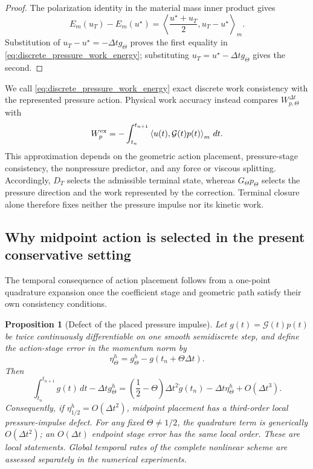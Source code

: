 \documentclass[11pt]{article}
\theoremstyle{plain}
\newtheorem{proposition}[theorem]{Proposition}
\theoremstyle{definition}
\theoremstyle{remark}
\newcommand{\G}{\mathcal{G}}
\newcommand{\dt}{\Delta t}
\newcommand{\Th}{\Theta}
\newcommand{\ip}[3][]{\left\langle #2,#3\right\rangle_{#1}}
\begin{document}
\begin{proof}
The polarization identity in the material mass inner product gives
\[
 E_m(u_T)-E_m(u^\star)
 =\ip[m]{\frac{u^\star+u_T}{2}}{u_T-u^\star}.
\]
Substitution of $u_T-u^\star=-\dt g_\Th$ proves the first equality in
\eqref{eq:discrete_pressure_work_energy}; substituting
$u_T=u^\star-\dt g_\Th$ gives the second.
\end{proof}

We call \eqref{eq:discrete_pressure_work_energy} exact discrete work
consistency with the represented pressure action.  Physical work accuracy
instead compares $W_{p,\Th}^{\dt}$ with
\begin{equation}
 W_p^{\rm ex}
 =-\int_{t_n}^{t_{n+1}}\ip[m]{u(t)}{\G(t)p(t)}\,dt.
 \label{eq:exact_continuous_pressure_work}
\end{equation}
This approximation depends on the geometric action placement, pressure-stage
consistency, the nonpressure predictor, and any force or viscous splitting.
Accordingly, $D_T$ selects the admissible terminal state, whereas
$G_\Th p_\Th$ selects the pressure direction and the work represented by the
correction.  Terminal closure alone therefore fixes neither the pressure
impulse nor its kinetic work.

\subsection{Why midpoint action is selected in the present conservative setting}

The temporal consequence of action placement follows from a one-point
quadrature expansion once the coefficient stage and geometric path satisfy
their own consistency conditions.

\begin{proposition}[Defect of the placed pressure impulse]
\label{prop:placed_impulse_order}
Let $g(t)=\G(t)p(t)$ be twice continuously differentiable on one smooth
semidiscrete step, and define the action-stage error in the momentum norm by
\begin{equation}
  \eta_\Th^h=g_\Th^h-g(t_n+\Th\dt).
\label{eq:second_order_stage_consistency}
\end{equation}
Then
\begin{equation}
 \int_{t_n}^{t_{n+1}}g(t)\,dt-\dt g_\Th^h
 =\left(\frac12-\Th\right)\dt^2\dot g(t_n)
  -\dt\eta_\Th^h+O(\dt^3).
 \label{eq:placed_impulse_defect}
\end{equation}
Consequently, if $\eta_{1/2}^h=O(\dt^2)$, midpoint placement has a
third-order local pressure-impulse defect.  For any fixed
$\Th\ne1/2$, the quadrature term is generically $O(\dt^2)$; an
$O(\dt)$ endpoint stage error has the same local order.  These are local
statements.  Global temporal rates of the complete nonlinear scheme are
assessed separately in the numerical experiments.
\end{proposition}
\end{document}
